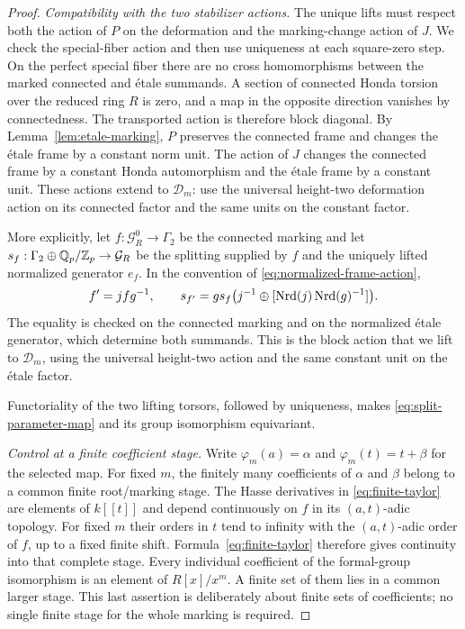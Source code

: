 \begin{proof}
\smallskip\noindent\emph{Compatibility with the two stabilizer actions.}
The unique lifts must respect both the action of $P$ on the deformation
and the marking-change action of $J$. We check the special-fiber action
and then use uniqueness at each square-zero step. On the perfect special
fiber there are
no cross homomorphisms between the marked connected and
\'{e}tale summands.  A section of connected Honda torsion over
the reduced ring $R$ is zero, and a map in the opposite direction
vanishes by connectedness.  The transported action is therefore
block diagonal.  By Lemma~\ref{lem:etale-marking}, $P$ preserves the
connected frame and changes the \'{e}tale frame by a constant
norm unit.  The action of $J$ changes the connected frame by a
constant Honda automorphism and the \'{e}tale frame by a
constant unit.  These actions extend to $\mathcal D_m$: use the
universal height-two deformation action on its connected factor and
the same units on the constant factor.  

More explicitly, let $f:\mathcal G_R^0\to\Gamma_2$ be the connected
marking and let $s_f:\Gamma_2\oplus\mathbb Q_p/\mathbb Z_p\to\mathcal G_R$ be the
splitting supplied by $f$ and the uniquely lifted normalized
generator $e_f$.  In the convention of
\eqref{eq:normalized-frame-action},
\[
 f'=jfg^{-1},\qquad
 s_{f'}=g s_f
       \bigl(j^{-1}\oplus[\operatorname{Nrd}(j)\operatorname{Nrd}(g)^{-1}]\bigr).
\]
The equality is checked on the connected marking and on the
normalized \'{e}tale generator, which determine both summands.
This is the block action that we lift to $\mathcal D_m$, using
the universal height-two action and the same constant unit on
the \'{e}tale factor.

Functoriality of the two
lifting torsors, followed by uniqueness, makes
\eqref{eq:split-parameter-map} and its group isomorphism equivariant.

\smallskip\noindent\emph{Control at a finite coefficient stage.}
Write $\varphi_m(a)=\alpha$ and $\varphi_m(t)=t+\beta$ for the selected
map. For fixed $m$, the finitely many coefficients of $\alpha$ and $\beta$
belong to a common finite root/marking stage.  The Hasse derivatives
in \eqref{eq:finite-taylor} are elements of $k[[t]]$ and depend
continuously on $f$ in its $(a,t)$-adic topology.  For fixed $m$ their
orders in $t$ tend to infinity with the $(a,t)$-adic order of $f$,
up to a fixed finite shift.  Formula~\eqref{eq:finite-taylor}
therefore gives continuity into that complete stage.  Every
individual coefficient of the formal-group isomorphism is an
element of $R[x]/x^m$.  A finite set of them lies in a common larger
stage.  This last assertion is deliberately about finite sets of
coefficients; no single finite stage for the whole marking is
required.
\end{proof}

